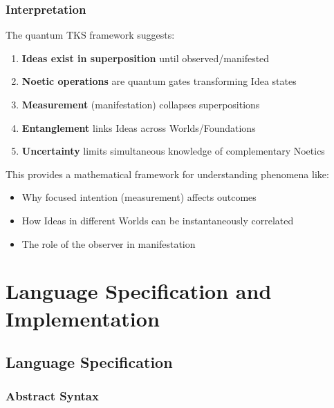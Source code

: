 \documentclass[11pt,twoside,openright]{book}
\theoremstyle{definition}
\theoremstyle{plain}
\theoremstyle{remark}
\begin{document}
\section{Interpretation}

The quantum TKS framework suggests:
\begin{enumerate}
  \item \textbf{Ideas exist in superposition} until observed/manifested
  \item \textbf{Noetic operations} are quantum gates transforming Idea states
  \item \textbf{Measurement} (manifestation) collapses superpositions
  \item \textbf{Entanglement} links Ideas across Worlds/Foundations
  \item \textbf{Uncertainty} limits simultaneous knowledge of complementary Noetics
\end{enumerate}

This provides a mathematical framework for understanding phenomena like:
\begin{itemize}
  \item Why focused intention (measurement) affects outcomes
  \item How Ideas in different Worlds can be instantaneously correlated
  \item The role of the observer in manifestation
\end{itemize}

\part{Language Specification and Implementation}

\chapter{Language Specification}
\label{ch:language-spec}

\section{Abstract Syntax}
\end{document}
